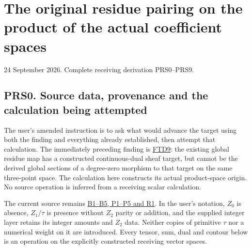 \section{The original residue pairing on the product of the actual
coefficient
spaces}\label{the-original-residue-pairing-on-the-product-of-the-actual-coefficient-spaces}

24 September 2026. Complete receiving derivation PRS0--PRS9.

\subsection{PRS0. Source data, provenance and the calculation being
attempted}\label{prs0.-source-data-provenance-and-the-calculation-being-attempted}

The user's amended instruction is to ask what would advance the target
using both the finding and everything already established, then attempt
that calculation. The immediately preceding finding is
\href{https://github.com/KokunoYumeto/zeta-function-research-reader/blob/main/workbenches/splitzero-tandem/continuations/20260925-full-source-tensor-and-original-divisor/counterfactual/FINITE_TOPOLOGY_DUALIZING_COMPLEX.md}{FTD9}:
the existing global residue map has a constructed continuous-dual sheaf
target, but cannot be the derived global sections of a degree-zero
morphism to that target on the same three-point space. The calculation
here constructs its actual product-space origin. No source operation is
inferred from a receiving scalar calculation.

The current source remains
\href{https://github.com/KokunoYumeto/zeta-function-research-reader/blob/36a82ecca98addb8a98b48204e349737856c7223/workbenches/splitzero-tandem/continuations/20260924-cohomology-weight-and-character-lifts/original-character-lifting/foundations/user_definitions_20260924/SOURCE_OPERATIONS_AND_PROOFS.md}{B1--B5,
P1--P5 and R1}. In the user's notation, \(Z_0\) is absence, \(Z_1/\tau\)
is presence without \(Z_2\) parity or addition, and the supplied integer
layer retains its integer amounts and \(Z_2\) data. Neither copies of
primitive \(\tau\) nor a numerical weight on it are introduced. Every
tensor, sum, dual and contour below is an operation on the explicitly
constructed receiving vector spaces.

